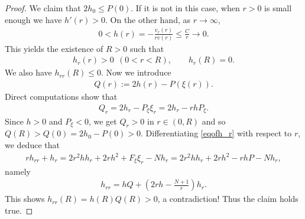 \documentclass[10pt,a4paper]{amsart}
\begin{document}
\begin{proof}
		We claim that $2h_0 \le P(0)$. If it is not in this case, when $r > 0$ is small enough we have $h'(r) > 0$. On the other hand, as $r \to \infty$,
		\begin{align*}
			0 < h(r) = -\frac{v_r(r)}{rv(r)} \le \frac{C}{r} \to 0.
		\end{align*}
		This yields the existence of $R > 0$ such that
		\begin{align*}
			h_r(r) > 0 ~~ (0 < r < R), \quad\quad h_r(R) = 0.
		\end{align*}
		We also have $h_{rr}(R) \le 0$. Now we introduce
		\begin{align*}
			Q(r) := 2h(r) - P(\xi(r)).
		\end{align*}
		Direct computations show that
		\begin{align*}
			Q_r = 2h_r - P_\xi \xi_r = 2h_r - rh P_\xi.
		\end{align*}
		Since $h > 0$ and $P_\xi < 0$, we get $Q_r > 0$ in $r \in (0,R)$ and so $Q(R) > Q(0) = 2h_0 - P(0) > 0$. Differentiating \eqref{eqofh_r} with respect to $r$, we deduce that
		\begin{align*}
			rh_{rr} + h_r = 2r^2hh_r + 2rh^2 + F_\xi \xi_r - Nh_r = 2r^2hh_r + 2rh^2 - rhP - Nh_r,
		\end{align*}
		namely
		\begin{align} \label{eqofhrr}
			h_{rr} = hQ + \left(2rh - \frac{N+1}{r}\right)h_r.
		\end{align}
		This shows $h_{rr}(R) = h(R)Q(R) > 0$, a contradiction! Thus the claim holds true.


\end{proof}
\end{document}
